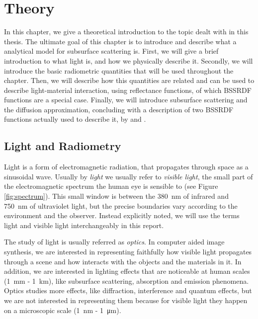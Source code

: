 \chapter{Theory}

In this chapter, we give a theoretical introduction to the topic dealt with in this thesis. The ultimate goal of this chapter is to introduce and describe what a analytical model for subsurface scattering is. First, we will give a brief introduction to what light is, and how we physically describe it. Secondly, we will introduce the basic radiometric quantities that will be used throughout the chapter. Then, we will describe how this quantities are related and can be used to describe light-material interaction, using reflectance functions, of which BSSRDF functions are a special case. Finally, we will introduce subsurface scattering and the diffusion approximation, concluding with a description of two BSSRDF functions actually used to describe it, by \cite{Jensen:2001:PMS:383259.383319} and \cite{IMM2013-06646}.

\section{Light and Radiometry}
Light is a form of electromagnetic radiation, that propagates through space as a sinusoidal wave. Usually by \emph{light} we usually refer to \emph{visible light}, the small part of the electromagnetic spectrum the human eye is sensible to (see Figure \ref{fig:spectrum}). This small window is between the \SI{380}{\nano\meter} of infrared and \SI{750}{\nano\meter} of ultraviolet light, but the precise boundaries vary according to the environment and the observer. Instead explicitly noted, we will use the terms light and visible light interchangeably in this report.

The study of light is usually referred as \emph{optics}. In computer aided image synthesis, we are interested in representing faithfully how visible light propagates through a scene and how interacts with the objects and the materials in it. In addition, we are interested in lighting effects that are noticeable at human scales (\SI{1}{\milli\meter} - \SI{1}{\kilo\meter}), like subsurface scattering, absorption and emission phenomena. Optics studies more effects, like diffraction, interference and quantum effects, but we are not interested in representing them because for visible light they happen on a microscopic scale (\SI{1}{\nano\meter} - \SI{1}{\micro\meter}). 


